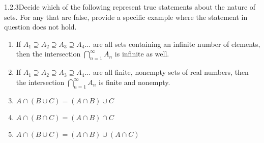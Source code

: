 
\begin{exercise}
    {1.2.3}Decide which of the following represent true statements about
the nature of sets. For any that are false, provide a specific example where the
statement in question does not hold.
\begin{enumerate}
    \item If $A_1 \supseteq A_2 \supseteq A_3 \supseteq A_4\dots$ are all sets containing an infinite number of
elements, then the intersection $\bigcap^\infty_{n=1} A_n$ is infinite as well.
    \item If $A_1 \supseteq A_2 \supseteq A_3 \supseteq A_4\dots$ are all finite, nonempty sets of real numbers,
then the intersection $\bigcap^\infty_{n=1} A_n$ is finite and nonempty.
    \item $A \cap (B \cup C) = (A \cap B) \cup C$
    \item $A \cap (B \cap C) = (A \cap B) \cap C$
    \item $A \cap (B \cup C) = (A \cap B) \cup (A \cap C)$
\end{enumerate}
\end{exercise}

